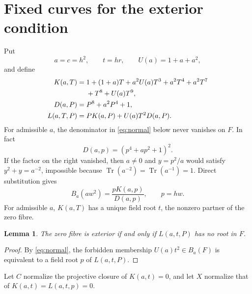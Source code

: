 \documentclass[11pt]{article}
\newtheorem{lemma}[theorem]{Lemma}
\theoremstyle{definition}\newtheorem{definition}[theorem]{Definition}
\theoremstyle{remark}\newtheorem{remark}[theorem]{Remark}
\DeclareMathOperator{\Tr}{Tr}
\begin{document}
\section{Fixed curves for the exterior condition}
Put
\[
 a=c=h^2,\qquad t=hr,\qquad U(a)=1+a+a^2,
\]
and define
\begin{align}
K(a,T)={}&1+(1+a)T+a^2U(a)T^3+a^2T^4+a^2T^7\notag\\
&+T^8+U(a)T^9,\label{eq:K}\\
D(a,P)={}&P^8+a^2P^4+1,\label{eq:D}\\
L(a,T,P)={}&P K(a,P)+U(a)T^2D(a,P).\label{eq:L}
\end{align}
For admissible \(a\), the denominator in \eqref{eq:normal} below never
vanishes on \(F\).  In fact
\[
 D(a,p)=(p^4+ap^2+1)^2.
\]
If the factor on the right vanished, then \(a\ne0\) and \(y=p^2/a\) would
satisfy \(y^2+y=a^{-2}\), impossible because
\(\Tr(a^{-2})=\Tr(a^{-1})=1\).
Direct substitution gives
\begin{equation}
 B_a(aw^2)=\frac{pK(a,p)}{D(a,p)},\qquad p=hw.
 \label{eq:normal}
\end{equation}
For admissible \(a\), \(K(a,T)\) has a unique field root \(t\), the nonzero
partner of the zero fibre.

\begin{lemma}
\label{lem:criterion}
The zero fibre is exterior if and only if \(L(a,t,P)\) has no root in \(F\).
\end{lemma}
\begin{proof}
By \eqref{eq:normal}, the forbidden membership \(U(a)t^2\in B_a(F)\) is
equivalent to a field root \(p\) of \(L(a,t,P)\).
\end{proof}

Let \(C\) normalize the projective closure of \(K(a,t)=0\), and let \(X\)
normalize that of \(K(a,t)=L(a,t,p)=0\).
\end{document}
